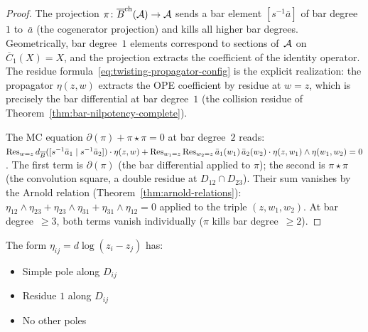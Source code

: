 \begin{proof}
The projection $\pi\colon \overline{B}^{\mathrm{ch}}(\mathcal{A}) \to \mathcal{A}$ sends
a bar element $[s^{-1}\bar{a}]$ of bar degree~$1$ to~$\bar{a}$
(the cogenerator projection) and kills all higher bar degrees.
Geometrically, bar degree~$1$ elements correspond to sections
of~$\mathcal{A}$ on $\overline{C}_1(X) = X$, and the projection extracts
the coefficient of the identity operator.  The residue
formula~\eqref{eq:twisting-propagator-config} is the explicit
realization: the propagator $\eta(z,w)$ extracts the OPE
coefficient by residue at $w = z$, which is precisely the bar
differential at bar degree~$1$
(the collision residue of
Theorem~\ref{thm:bar-nilpotency-complete}).

The MC equation $\partial(\pi) + \pi \star \pi = 0$ at bar
degree~$2$ reads:
$\operatorname{Res}_{w=z} d_{\overline{B}}([s^{-1}\bar{a}_1 \mid
s^{-1}\bar{a}_2]) \cdot \eta(z,w)
+ \operatorname{Res}_{w_1=z} \operatorname{Res}_{w_2=z}
\bar{a}_1(w_1)\,\bar{a}_2(w_2) \cdot
\eta(z,w_1) \wedge \eta(w_1,w_2) = 0$.
The first term is $\partial(\pi)$ (the bar differential applied to
$\pi$); the second is $\pi \star \pi$ (the convolution square,
a double residue at $D_{12} \cap D_{23}$).  Their sum vanishes by
the Arnold relation (Theorem~\ref{thm:arnold-relations}):
$\eta_{12} \wedge \eta_{23} + \eta_{23} \wedge \eta_{31}
+ \eta_{31} \wedge \eta_{12} = 0$ applied to the triple
$(z, w_1, w_2)$.
At bar degree~$\geq 3$, both terms vanish individually
($\pi$ kills bar degree~$\geq 2$).
\end{proof}

\begin{lemma}\label{lem:basic-log-form-residue}
The form $\eta_{ij} = d\log(z_i - z_j)$ has:
\begin{itemize}
\item Simple pole along $D_{ij}$
\item Residue $1$ along $D_{ij}$
\item No other poles
\end{itemize}
\end{lemma}


